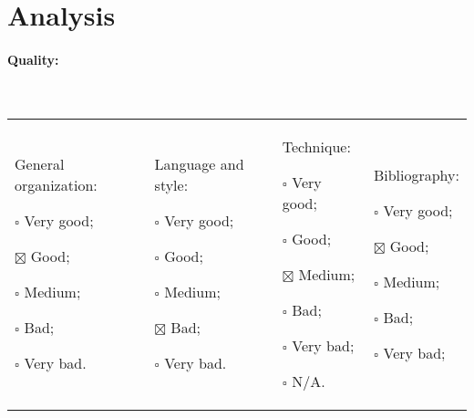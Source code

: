 \documentclass[11pt]{article}
\begin{document}
\section{Analysis}

\paragraph{Quality:} ~\newline
\begin{tabular}{p{}p{}p{}p{}}
\begin{minipage}[t]{.25\textwidth}
General organization:
\begin{description}
\item $\square$ Very good;
\item $\boxtimes$ Good;
\item $\square$ Medium;
\item $\square$ Bad;
\item $\square$ Very bad.
\end{description}
\end{minipage}

&

\begin{minipage}[t]{.25\textwidth}
Language and style:
\begin{description}
\item $\square$ Very good;
\item $\square$ Good;
\item $\square$ Medium;
\item $\boxtimes$ Bad;
\item $\square$ Very bad.
\end{description}
\end{minipage}

&

\begin{minipage}[t]{.25\textwidth}
Technique:
\begin{description}
\item $\square$ Very good;
\item $\square$ Good;
\item $\boxtimes$ Medium;
\item $\square$ Bad;
\item $\square$ Very bad;
\item $\square$ N/A.
\end{description}
\end{minipage}

&

\begin{minipage}[t]{.25\textwidth}
Bibliography:
\begin{description}
\item $\square$ Very good;
\item $\boxtimes$ Good;
\item $\square$ Medium;
\item $\square$ Bad;
\item $\square$ Very bad;
\end{description}
\end{minipage}
\end{tabular}
\end{document}
